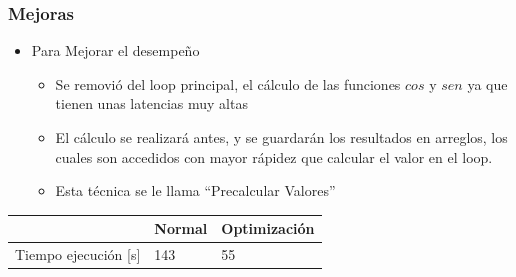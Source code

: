 \documentclass{beamer}
\begin{document}
\frame
{
\frametitle{Mejoras}

\begin{itemize}
\item  Para Mejorar el desempeño
\begin{itemize}

\item Se removió del loop principal, el cálculo de las funciones $cos$ y $sen$ ya que tienen unas latencias muy altas
\item El cálculo se realizará antes,  y se guardarán los resultados en arreglos, los cuales son accedidos con mayor rápidez que calcular el valor en el loop.
\item Esta técnica se le llama ``Precalcular Valores''

\end{itemize}
\end{itemize}
\begin{center}
\begin{tabular}{|l|l|l|}
\hline
& Normal & Optimización\\
\hline
Tiempo ejecución [s] & 143 & 55\\
\hline
\end{tabular}
\end{center}
}

\end{document}
